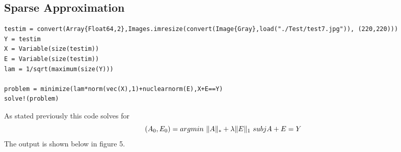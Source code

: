 \documentclass[11pt]{article} %
\DeclarePairedDelimiter{\norm}{\lVert}{\rVert}
\begin{document}
\subsection{Sparse Approximation}

\begin{lstlisting}
testim = convert(Array{Float64,2},Images.imresize(convert(Image{Gray},load("./Test/test7.jpg")), (220,220)))
Y = testim
X = Variable(size(testim))
E = Variable(size(testim))
lam = 1/sqrt(maximum(size(Y)))

problem = minimize(lam*norm(vec(X),1)+nuclearnorm(E),X+E==Y)
solve!(problem)
\end{lstlisting}

As stated previously this code solves for
\[ (A_{0} ,E_{0}) = argmin \ \norm{A}_{*} + \lambda \norm{E}_{1} \ subj A+E = Y \]
The output is shown below in figure 5.
\end{document}
